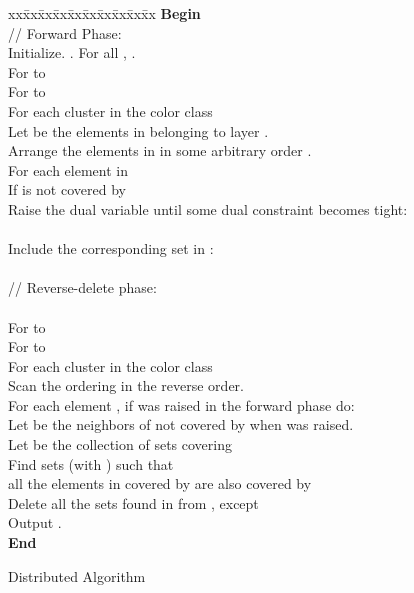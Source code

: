 \documentclass[11pt]{article}
\begin{document}
\begin{figure}
\begin{center}
\begin{boxedminipage}{\hsize}
\begin{small}
\begin{tabbing}
xx\=xx\=xx\=xx\=xx\=xx\=xx\=xx\=xx\=xx\kill
\textbf{Begin}  \\
\> // Forward Phase:\\
\> Initialize. . For all , .\\
\> For  to \\
\> \> For  to \\
\> \> \> For each cluster  in the color class \\
\> \> \> \> Let  be the elements in  belonging to layer .\\
\> \> \> \> Arrange the elements in  in some arbitrary order .\\
\> \> \> \> For each element  in \\
\> \> \> \> \> If  is not covered by \\
\> \> \> \> \> \> Raise the dual variable  until some dual constraint becomes tight:\\
\> \> \> \> \> \> \> \\
\> \> \> \> \> \> \> Include the corresponding set  in :\\
\>\\
\> // Reverse-delete phase:\\
\> \\
\> For  to \\
\> \> For  to \\
\> \> \> For each cluster  in the color class \\
\> \> \> \> Scan the ordering  in the reverse order.\\
\> \> \> \> For each element , if  was raised in the forward phase do:\\
\> \> \> \> \> Let  be the neighbors of  not covered by  when  was raised.\\
\> \> \> \> \> Let  be the collection of sets covering \\
\> \> \> \> \> Find sets  (with ) such that\\
\> \> \> \> \> \> all the elements in  covered by  are also covered by \\
\> \> \> \> \> Delete all the sets found in  from , except \\
\> Output .\\
\textbf{End}
\end{tabbing}
\end{small}
\end{boxedminipage}
\end{center}
\caption{Distributed Algorithm}
\label{fig:dist}
\end{figure}
\end{document}
